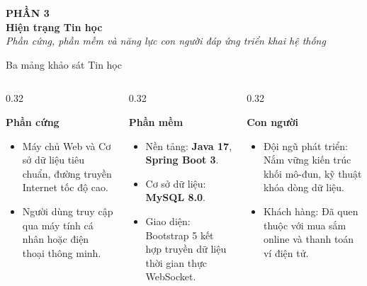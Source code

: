 \documentclass[aspectratio=169, 10pt]{beamer}
\begin{document}
\begin{frame}
    \begin{center}
        \vspace{1.5cm}
        {\Large \textbf{\color{primaryNavy}PHẦN 3}}\\[0.5cm]
        {\huge \textbf{\color{primaryNavy}Hiện trạng Tin học}}\\[0.6cm]
        \textit{\color{secondarySlate}Phần cứng, phần mềm và năng lực con người đáp ứng triển khai hệ thống}
    \end{center}
\end{frame}

\begin{frame}{Ba mảng khảo sát Tin học}
    \begin{columns}[t]
        \begin{column}{0.32\textwidth}
            \begin{block}{\centering \textbf{Phần cứng}}
                \begin{itemize}
                    \item Máy chủ Web và Cơ sở dữ liệu tiêu chuẩn, đường truyền Internet tốc độ cao.
                    \item Người dùng truy cập qua máy tính cá nhân hoặc điện thoại thông minh.
                \end{itemize}
            \end{block}
        \end{column}
        \begin{column}{0.32\textwidth}
            \begin{block}{\centering \textbf{Phần mềm}}
                \begin{itemize}
                    \item Nền tảng: \textbf{Java 17}, \textbf{Spring Boot 3}.
                    \item Cơ sở dữ liệu: \textbf{MySQL 8.0}.
                    \item Giao diện: Bootstrap 5 kết hợp truyền dữ liệu thời gian thực WebSocket.
                \end{itemize}
            \end{block}
        \end{column}
        \begin{column}{0.32\textwidth}
            \begin{block}{\centering \textbf{Con người}}
                \begin{itemize}
                    \item Đội ngũ phát triển: Nắm vững kiến trúc khối mô-đun, kỹ thuật khóa dòng dữ liệu.
                    \item Khách hàng: Đã quen thuộc với mua sắm online và thanh toán ví điện tử.
                \end{itemize}
            \end{block}
        \end{column}
    \end{columns}
\end{frame}
\end{document}
